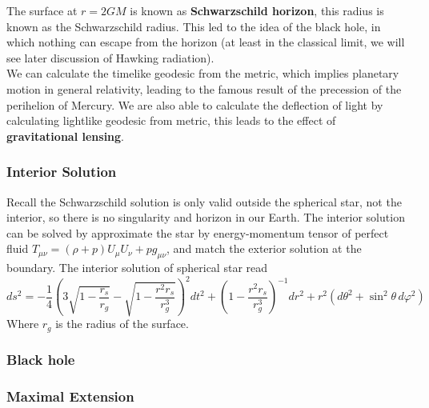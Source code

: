 \documentclass[12pt]{article}
\theoremstyle{mystyle}{\newtheorem{definition}{Definition}[section]}
\theoremstyle{mystyle}{\newtheorem{theorem}[definition]{Theorem}}
\theoremstyle{mystyle}{\newtheorem*{remark}{Remark}}
\theoremstyle{mystyle}{\newtheorem*{example}{Example}}
\theoremstyle{mystyle}{\newtheorem*{examples}{Examples}}
\theoremstyle{cstyle}{\newtheorem*{cthm}{}}
\begin{document}
The surface at \(r = 2GM\) is known as \textbf{Schwarzschild horizon}, this radius is known as the Schwarzschild radius.
This led to the idea of the black hole, in which nothing can escape from the horizon (at least in the classical limit, we will see later discussion of Hawking radiation). \\
We can calculate the timelike geodesic from the metric, which implies planetary motion in general relativity, leading to the famous result of the precession of the perihelion of Mercury.
We are also able to calculate the deflection of light by calculating lightlike geodesic from metric, this leads to the effect of \textbf{gravitational lensing}.

\subsubsection{Interior Solution}

Recall the Schwarzschild solution is only valid outside the spherical star, not the interior, so there is no singularity and horizon in our Earth.
The interior solution can be solved by approximate the star by energy-momentum tensor of perfect fluid \(T_{\mu\nu} = (\rho + p)U_\mu U_\nu + pg_{\mu\nu}\),
and match the exterior solution at the boundary. The interior solution of spherical star read \[ds^{2} =
  -\frac{1}{4} \left( 3 \sqrt{1-\frac {r_s}{r_g}}-\sqrt{1-\frac{r^2 r_s}{r_g^3}} \right)^2 dt^2 +
  \left( 1-\frac{r^2 r_s}{r_g^3} \right)^{-1} dr^2 + r^2 \left(d\theta^2 + \sin^2\theta \, d\varphi^2\right)\]
Where \(r_{g}\) is the radius of the surface.

\subsubsection{Black hole}

\subsubsection{Maximal Extension}
\end{document}

